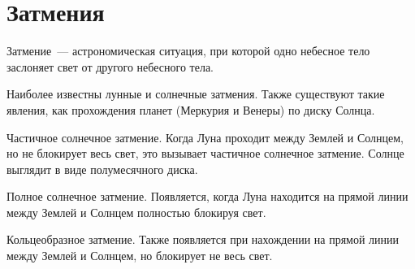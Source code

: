 \documentclass{article}
\begin{document}
	\section{Затмения}
	Затмение~--- астрономическая ситуация, при которой одно небесное тело заслоняет свет от другого
	небесного тела.

	Наиболее известны лунные и солнечные затмения. Также существуют такие явления, как прохождения планет
	(Меркурия и Венеры) по диску Солнца.

	Частичное солнечное затмение. Когда Луна проходит между Землей и Солнцем, но не блокирует весь свет,
	это вызывает частичное солнечное затмение. Солнце выглядит в виде полумесячного диска.
	
	Полное солнечное затмение. Появляется, когда Луна находится на прямой линии между Землей и Солнцем
	полностью блокируя свет.
	
	Кольцеобразное затмение. Также появляется при нахождении на прямой линии между Землей и Солнцем, но
	блокирует не весь свет.
	
\end{document}

